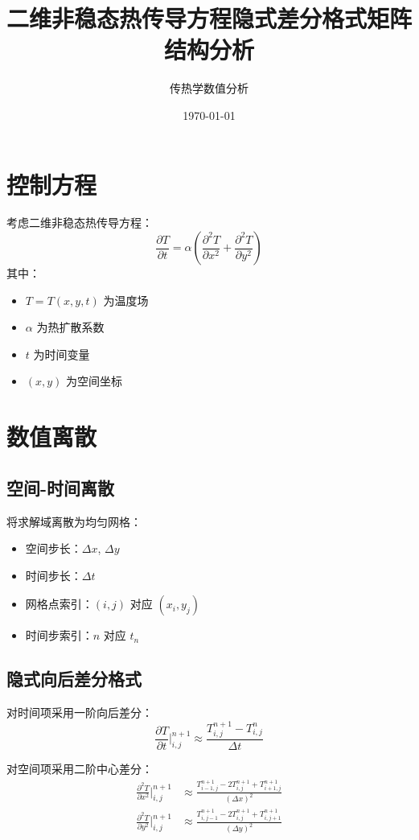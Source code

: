 \documentclass{ctexart}
\title{二维非稳态热传导方程隐式差分格式矩阵结构分析}
\author{传热学数值分析}
\date{\today}
\begin{document}
\maketitle

\section{控制方程}
考虑二维非稳态热传导方程：
\begin{equation}
\frac{\partial T}{\partial t} = \alpha \left( \frac{\partial^2 T}{\partial x^2} + \frac{\partial^2 T}{\partial y^2} \right)
\label{eq:heat}
\end{equation}
其中：
\begin{itemize}
\item $T = T(x,y,t)$ 为温度场
\item $\alpha$ 为热扩散系数
\item $t$ 为时间变量
\item $(x,y)$ 为空间坐标
\end{itemize}

\section{数值离散}

\subsection{空间-时间离散}
将求解域离散为均匀网格：
\begin{itemize}
\item 空间步长：$\Delta x$, $\Delta y$
\item 时间步长：$\Delta t$
\item 网格点索引：$(i,j)$ 对应 $(x_i,y_j)$
\item 时间步索引：$n$ 对应 $t_n$
\end{itemize}

\subsection{隐式向后差分格式}
对时间项采用一阶向后差分：
\begin{equation}
\frac{\partial T}{\partial t} \bigg|_{i,j}^{n+1} \approx \frac{T_{i,j}^{n+1} - T_{i,j}^n}{\Delta t}
\end{equation}

对空间项采用二阶中心差分：
\begin{align}
\frac{\partial^2 T}{\partial x^2} \bigg|_{i,j}^{n+1} &\approx \frac{T_{i-1,j}^{n+1} - 2T_{i,j}^{n+1} + T_{i+1,j}^{n+1}}{(\Delta x)^2} \\
\frac{\partial^2 T}{\partial y^2} \bigg|_{i,j}^{n+1} &\approx \frac{T_{i,j-1}^{n+1} - 2T_{i,j}^{n+1} + T_{i,j+1}^{n+1}}{(\Delta y)^2}
\end{align}
\end{document}
